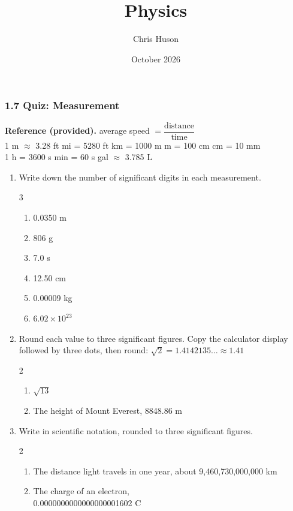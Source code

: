 \documentclass[12pt, twoside]{article}
\title{Physics}
\author{Chris Huson}
\date{October 2026}
\begin{document}
\subsubsection*{1.7 Quiz: Measurement}

\textbf{Reference (provided).} \quad
average speed $= \dfrac{\text{distance}}{\text{time}}$ \\[0.1cm]
1 m $\approx$ 3.28 ft  mi = 5280 ft  km = 1000 m  m = 100 cm
 cm = 10 mm \\
1 h = 3600 s  min = 60 s  gal $\approx$ 3.785 L

\vspace{0.3cm}

\begin{enumerate}[itemsep=0.8cm]

\item Write down the number of significant digits in each measurement.
  \begin{multicols}{3}
    \begin{enumerate}[itemsep=0.5cm]
      \item 0.0350 m
      \item 806 g
      \item 7.0 s
      \item 12.50 cm
      \item \num{0.00009} kg
      \item $6.02 \times 10^{23}$
    \end{enumerate}
  \end{multicols} \vspace{0.3cm}

\item Round each value to three significant figures. Copy the calculator display
  followed by three dots, then round: $\sqrt{2} = 1.4142135\ldots \approx 1.41$
  \begin{multicols}{2}
    \raggedright
    \begin{enumerate}
      \item $\sqrt{13}$
      \item The height of Mount Everest, 8848.86 m
    \end{enumerate}
  \end{multicols} \vspace{1.6cm}

\item Write in scientific notation, rounded to three significant figures.
  \begin{multicols}{2}
    \raggedright
    \begin{enumerate}
      \item The distance light travels in one year, about 9{,}460{,}730{,}000{,}000 km
      \item The charge of an electron, \\
        \num{0.0000000000000000001602} C
    \end{enumerate}
  \end{multicols} \vspace{1.6cm}


\end{enumerate}
\end{document}
